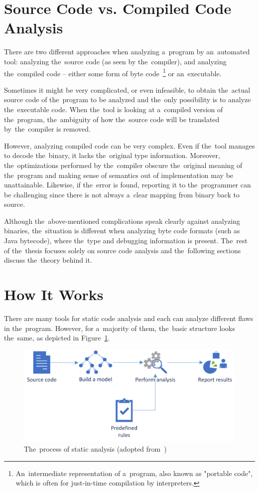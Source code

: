 \documentclass[
  digital, %
  table,   %
  lof,     %
  lot,     %
  oneside,
]{fithesis3}
\begin{document}
\section{Source Code vs. Compiled Code Analysis}
There are two different approaches when analyzing a~program by an~automated tool: analyzing the~source code (as seen by the~compiler), and analyzing the~compiled code -- either some form of byte code~\footnote{An~intermediate representation of a~program, also known as "portable code", which is often for just-in-time compilation by interpreters.} or an~executable.

Sometimes it might be very complicated, or even infeasible, to obtain the~actual source code of the~program to be analyzed and the~only possibility is to analyze the~executable code. When the~tool is looking at a~compiled version of the~program, the~ambiguity of how the~source code will be translated by~the~compiler is removed.

However, analyzing compiled code can be very complex. Even if the~tool manages to decode the~binary, it lacks the~original type information. Moreover, the~optimizations performed by the~compiler obscure the~original meaning of the~program and making sense of semantics out of implementation may be unattainable. Likewise, if the~error is found, reporting it to the~programmer can be challenging since there is not always a~clear mapping from binary back to source. 

Although the~above-mentioned complications speak clearly against analyzing binaries, the~situation is different when analyzing byte code formats (such as Java bytecode), where the~type and debugging information is present. The~rest of the~thesis focuses solely on source code analysis and the~following sections discuss the~theory behind it.

\section{How It Works}
There are many tools for static code analysis and each can analyze different flaws in the~program. However, for a~majority of them, the~basic structure looks the~same, as depicted in Figure~\ref{fig:static-code-analysis-internals}.

\begin{figure}[h!]
		\centering
			\includegraphics[scale=0.80]{img/static-code-analysis-internals}
		\caption{The~process of static analysis (adopted from~\cite{secure-programming-with-sca})}
		\label{fig:static-code-analysis-internals}
\end{figure}
\end{document}
